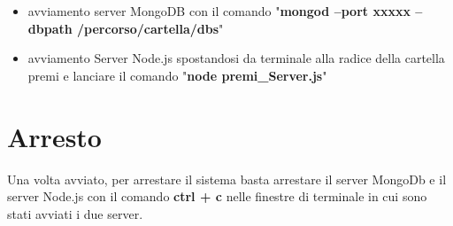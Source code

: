 \begin{itemize}
\item avviamento server MongoDB con il comando "\textbf{mongod --port xxxxx --dbpath /percorso/cartella/dbs}"
\item  avviamento Server Node.js spostandosi da terminale alla radice della cartella premi e lanciare il comando "\textbf{node premi\_Server.js}" 
\end{itemize}


\section{Arresto}
Una volta avviato, per arrestare il sistema basta arrestare il server MongoDb e il server Node.js con il comando \textbf{ctrl + c} nelle finestre di terminale in cui sono stati avviati i due server.

